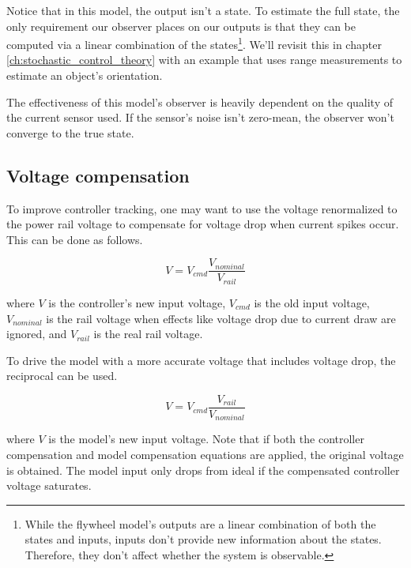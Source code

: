 Notice that in this \gls{model}, the \gls{output} isn't a \gls{state}. To
estimate the full \gls{state}, the only requirement our \gls{observer} places on
our \glspl{output} is that they can be computed via a linear combination of the
\glspl{state}\footnote{While the flywheel model's outputs are a linear
combination of both the states and inputs, \glspl{input} don't provide new
information about the \glspl{state}. Therefore, they don't affect whether the
system is observable.}. We'll revisit this in chapter
\ref{ch:stochastic_control_theory} with an example that uses range measurements
to estimate an object's orientation.

The effectiveness of this \gls{model}'s \gls{observer} is heavily dependent on
the quality of the current sensor used. If the sensor's noise isn't zero-mean,
the \gls{observer} won't converge to the true \gls{state}.

\subsection{Voltage compensation}

To improve controller \gls{tracking}, one may want to use the voltage
renormalized to the power rail voltage to compensate for voltage drop when
current spikes occur. This can be done as follows.

\begin{equation}
  V = V_{cmd} \frac{V_{nominal}}{V_{rail}}
\end{equation}

where $V$ is the \gls{controller}'s new input voltage, $V_{cmd}$ is the old
input voltage, $V_{nominal}$ is the rail voltage when effects like voltage drop
due to current draw are ignored, and $V_{rail}$ is the real rail voltage.

To drive the \gls{model} with a more accurate voltage that includes voltage
drop, the reciprocal can be used.

\begin{equation}
  V = V_{cmd} \frac{V_{rail}}{V_{nominal}}
\end{equation}

where $V$ is the \gls{model}'s new input voltage. Note that if both the
\gls{controller} compensation and \gls{model} compensation equations are
applied, the original voltage is obtained. The \gls{model} input only drops from
ideal if the compensated \gls{controller} voltage saturates.
